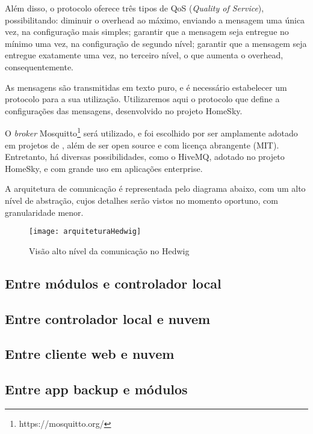 Além disso, o protocolo \wmqtt{} oferece três tipos de QoS (\textit{Quality of Service}), possibilitando: diminuir o overhead ao máximo, enviando a mensagem uma única vez, na configuração mais simples; garantir que a mensagem seja entregue no mínimo uma vez, na configuração de segundo nível; garantir que a mensagem seja entregue exatamente uma vez, no terceiro nível, o que aumenta o overhead, consequentemente.

As mensagens são transmitidas em texto puro, e é necessário estabelecer um protocolo para a sua utilização. Utilizaremos aqui o protocolo que define a configurações das mensagens, desenvolvido no projeto HomeSky.

O \textit{broker} Mosquitto\footnote{https://mosquitto.org/} será utilizado, e foi escolhido por ser amplamente adotado em projetos de \wiot{}, além de ser open source e com licença abrangente (MIT). Entretanto, há diversas possibilidades, como o HiveMQ, adotado no projeto HomeSky, e com grande uso em aplicações enterprise.

A arquitetura de comunicação é representada pelo diagrama abaixo, com um alto nível de abstração, cujos detalhes serão vistos no momento oportuno, com granularidade menor.

\begin{figure}[H]
	\centering
	\caption{Visão alto nível da comunicação no Hedwig}
  \texttt{[image: arquiteturaHedwig]}
\label{fig:diagramaComunicacao}
\end{figure}

\subsection{Entre módulos e controlador local}
\subsection{Entre controlador local e nuvem}
\subsection{Entre cliente web e nuvem}
\subsection{Entre app backup e módulos}
